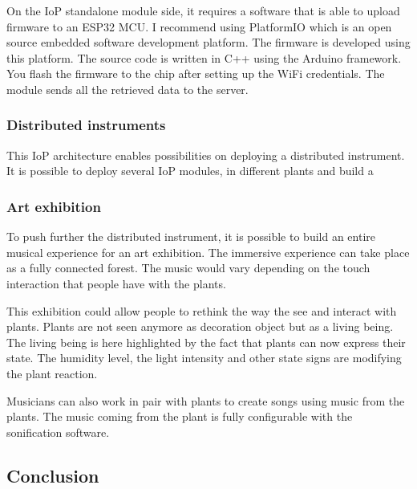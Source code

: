 On the IoP standalone module side, it requires a software that is able to upload 
firmware to an ESP32 MCU. I recommend using PlatformIO which is an open source 
embedded software development platform. The firmware is developed using this platform.
The source code is written in C++ using the Arduino framework. You flash the firmware
to the chip after setting up the WiFi credentials.
The module sends all the retrieved data to the server.

\subsubsection{Distributed instruments}

This IoP architecture enables possibilities on deploying a distributed instrument.
It is possible to deploy several IoP modules, in different plants and build a 

\subsubsection{Art exhibition}

To push further the distributed instrument, it is possible to build an entire 
musical experience for an art exhibition.
The immersive experience can take place as a fully connected forest. The music would vary
depending on the touch interaction that people have with the plants.


This exhibition could allow people to rethink the way the see and interact with plants.
Plants are not seen anymore as decoration object but as a living being.
The living being is here highlighted by the fact that plants can now express their state.
The humidity level, the light intensity and other state signs are modifying the plant 
reaction.


Musicians can also work in pair with plants to create songs using music from the plants.
The music coming from the plant is fully configurable with the sonification software.


\subsection{Conclusion}

